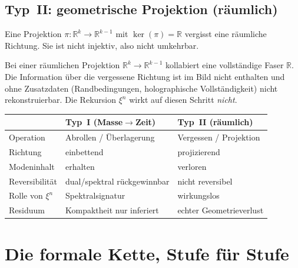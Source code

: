 \subsection{Typ~II: geometrische Projektion (r\"aumlich)}

\begin{definition}\label{def:typeII}
Eine Projektion $\pi:\mathbb{R}^{k}\to\mathbb{R}^{k-1}$ mit
$\ker(\pi)=\mathbb{R}$ vergisst eine r\"aumliche Richtung. Sie ist nicht
injektiv, also nicht umkehrbar.
\end{definition}

\begin{theorem}\label{satz:typeII}
Bei einer r\"aumlichen Projektion $\mathbb{R}^k \to \mathbb{R}^{k-1}$ kollabiert
eine vollst\"andige Faser $\mathbb{R}$. Die Information \"uber die vergessene
Richtung ist im Bild nicht enthalten und ohne Zusatzdaten (Randbedingungen,
holographische Vollst\"andigkeit) nicht rekonstruierbar. Die Rekursion $\xi^n$
wirkt auf diesen Schritt \emph{nicht}.
\end{theorem}

\begin{center}
\begin{tabular}{lll}
\hline
 & \textbf{Typ~I (Masse$\to$Zeit)} & \textbf{Typ~II (r\"aumlich)} \\
\hline
Operation & Abrollen / \"Uberlagerung & Vergessen / Projektion \\
Richtung & einbettend & projizierend \\
Modeninhalt & erhalten & verloren \\
Reversibilit\"at & dual/spektral r\"uckgewinnbar & nicht reversibel \\
Rolle von $\xi^n$ & Spektralsignatur & wirkungslos \\
Residuum & Kompaktheit nur inferiert & echter Geometrieverlust \\
\hline
\end{tabular}
\end{center}

\section{Die formale Kette, Stufe f\"ur Stufe}

